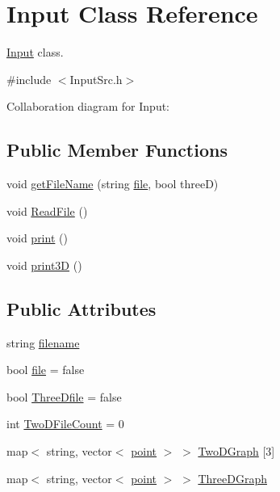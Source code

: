 \hypertarget{classInput}{}\section{Input Class Reference}
\label{classInput}


\hyperlink{classInput}{Input} class.  




{\ttfamily \#include $<$Input\+Src.\+h$>$}



Collaboration diagram for Input\+:
\subsection*{Public Member Functions}
\begin{DoxyCompactItemize}
\item 
void \hyperlink{classInput_a45065353b80f9980111402e827aae0fe}{get\+File\+Name} (string \hyperlink{classInput_ad073fa115ead2e8b7492214215ebd22d}{file}, bool threeD)
\item 
void \hyperlink{classInput_a9d9395f68b01faa00f962791878723a2}{Read\+File} ()
\item 
void \hyperlink{classInput_a862e529a6ed3fcfd0719274a04174b7d}{print} ()
\item 
void \hyperlink{classInput_aced126e54ffa271b2a40f7e7a5e90376}{print3D} ()
\end{DoxyCompactItemize}
\subsection*{Public Attributes}
\begin{DoxyCompactItemize}
\item 
string \hyperlink{classInput_af296359065236ac9139aab7736d6844d}{filename}
\item 
bool \hyperlink{classInput_ad073fa115ead2e8b7492214215ebd22d}{file} = false
\item 
bool \hyperlink{classInput_aacb0e034125e32179081a97eecab47df}{Three\+Dfile} = false
\item 
int \hyperlink{classInput_a82141fe9142aec447f9ef52fd2f78c73}{Two\+D\+File\+Count} = 0
\item 
map$<$ string, vector$<$ \hyperlink{structpoint}{point} $>$ $>$ \hyperlink{classInput_a55526617adbcb0db4b3d565f4dbe772d}{Two\+D\+Graph} \mbox{[}3\mbox{]}
\item 
map$<$ string, vector$<$ \hyperlink{structpoint}{point} $>$ $>$ \hyperlink{classInput_aed882deebbb45d8423e5477e8ccaee60}{Three\+D\+Graph}
\end{DoxyCompactItemize}


